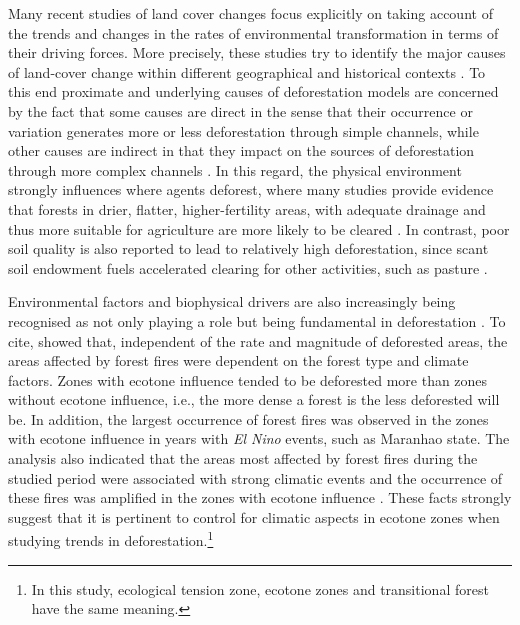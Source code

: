
Many recent studies of land cover changes focus explicitly on taking account of the trends and changes in the rates of environmental transformation in terms of their driving forces. More precisely, these studies try to identify the major causes of land-cover change within different geographical and historical contexts \citep{GEIST}. To this end proximate and underlying causes of deforestation models are concerned by the fact that some causes are direct in the sense that their occurrence or variation generates more or less deforestation through simple channels, while other causes are indirect in that they impact on the sources of deforestation through more complex channels \citep{MOTEL}. In this regard, the physical environment strongly influences where agents deforest, where many studies provide evidence that forests in drier, flatter, higher-fertility areas, with adequate drainage and thus more suitable for agriculture are more likely to be cleared \citep{ANGELSEN4}. In contrast, poor soil quality is also reported to lead to relatively high deforestation, since scant soil endowment fuels accelerated clearing for other activities, such as pasture \citep{GEIST,COSTA}. 

Environmental factors and  biophysical drivers are also increasingly being recognised as not only playing a role but being fundamental in deforestation \citep{GEIST}. To cite, \citet{BARNI} showed that, independent of the rate and magnitude of deforested areas, the areas affected by forest fires were dependent on the forest type and climate factors. Zones with ecotone influence tended to be deforested more than zones without ecotone influence, i.e., the more dense a forest is the less deforested will be. In addition, the largest occurrence of forest fires was observed in the zones with ecotone influence in years with \textit{El Nino} events, such as Maranhao state. The analysis also indicated that the areas most affected by forest fires during the studied period were associated with strong climatic events and the occurrence of these fires was amplified in the zones with ecotone influence \citep{BARNI}. These facts strongly suggest that it is pertinent to control for climatic aspects in ecotone zones when studying trends in deforestation.\footnote{In this study, ecological tension zone, ecotone zones and transitional forest have the same meaning. } 




